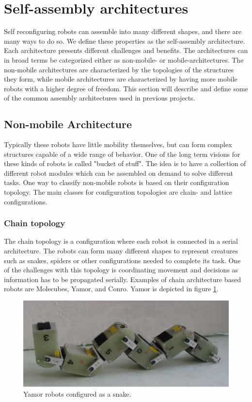 \section{Self-assembly architectures}
\label{sec:sfArchitecture}
Self reconfiguring robots can assemble into many different shapes, and there are many ways to do so.
We define these properties as the self-assembly architecture.
Each architecture presents different challenges and benefits.
The architectures can in broad terms be categorized either as non-mobile- or mobile-architectures.
The non-mobile architectures are characterized by the topologies of the structures they form, while mobile architectures are characterized by having more mobile robots with a higher degree of freedom.
This section will describe and define some of the common assembly architectures used in previous projects.
\subsection{Non-mobile Architecture}
Typically these robots have little mobility themselves, but can form complex structures capable of a wide range of behavior.
One of the long term visions for these kinds of robots is called "bucket of stuff"\cite{yim_modular_2007}.
The idea is to have a collection of different robot modules which can be assembled on demand to solve different tasks.
One way to classify non-mobile robots is based on their configuration topology.
The main classes for configuration topologies are chain- and lattice configurations.
\subsubsection{Chain topology}
The chain topology is a configuration where each robot is connected in a serial architecture.
The robots can form many different shapes to represent creatures such as snakes, spiders or other configurations needed to complete its task.
One of the challenges with this topology is coordinating movement and decisions as information has to be propagated serially.
Examples of chain architecture based robots are Molecubes\cite{zykov_molecubes:_2007}, Yamor\cite{mockel_yamor_2006}, and Conro\cite{castano_conro:_2000}.
Yamor is depicted in figure \ref{fig:yamor}.
\begin{figure}[H]	
	\centering
	\includegraphics[scale=0.5]{chapters/res/Yamor.PNG}
	\caption{Yamor robots configured as a snake\cite{mockel_yamor_2006}.}
	\label{fig:yamor}
\end{figure}

